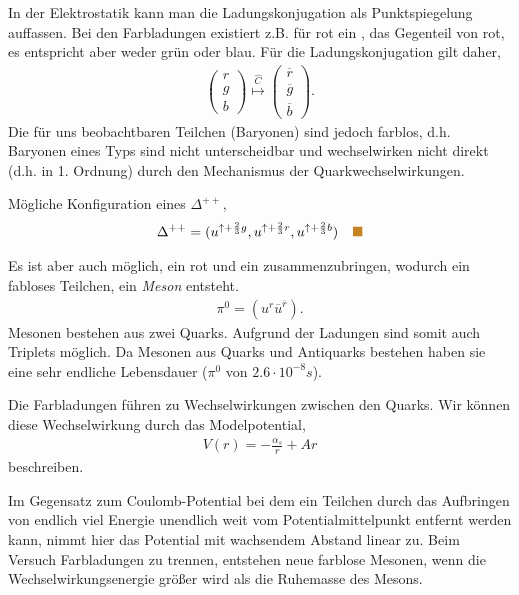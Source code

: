 In der Elektrostatik kann man die Ladungskonjugation als Punktspiegelung
auffassen. Bei den Farbladungen existiert z.B. für rot ein
, das Gegenteil von rot, es entspricht aber weder grün
oder blau. Für die Ladungskonjugation gilt daher,
\begin{align*}
\begin{pmatrix}
r \\ g \\ b
\end{pmatrix}
\overset{\hat{C}}{\mapsto}
\begin{pmatrix}
\overline{r} \\ \overline{g} \\ \overline{b}
\end{pmatrix}.
\end{align*}
Die für uns beobachtbaren Teilchen (Baryonen) sind jedoch farblos, d.h.
Baryonen eines Typs sind nicht unterscheidbar und wechselwirken nicht direkt
(d.h. in 1. Ordnung) durch den Mechanismus der Quarkwechselwirkungen.
\begin{bspn} Mögliche Konfiguration eines $\Delta^{++}$,
\begin{align*}
\Delta^{++} = (u^{\uparrow+\frac{2}{3}g},
 	  u^{\uparrow+\frac{2}{3}r},
 	  u^{\uparrow+\frac{2}{3}b})\bsphere
\end{align*}
\end{bspn}
\begin{bspn}
Es ist aber auch möglich, ein rot und ein  zusammenzubringen,
wodurch ein fabloses Teilchen, ein \emph{Meson} entsteht.
\begin{align*}
\pi^0 = (u^{r}\overline{u}^{\overline{r}}).
\end{align*}
Mesonen bestehen aus zwei Quarks. Aufgrund der Ladungen sind somit auch
Triplets möglich. Da Mesonen aus Quarks und Antiquarks bestehen haben sie eine
sehr endliche Lebensdauer ($\pi^0$ von $2.6\cdot 10^{-8}s$).\bsphere
\end{bspn}

Die Farbladungen führen zu Wechselwirkungen zwischen den Quarks. Wir können
diese Wechselwirkung durch das Modelpotential,
\begin{align*}
V(r) = -\frac{\alpha_s}{r} + Ar
\end{align*}
beschreiben.

Im Gegensatz zum Coulomb-Potential bei dem ein Teilchen durch das Aufbringen
von endlich viel Energie unendlich weit vom Potentialmittelpunkt entfernt
werden kann, nimmt hier das Potential mit wachsendem Abstand linear zu.
Beim Versuch Farbladungen zu trennen, entstehen neue farblose Mesonen, wenn die
Wechselwirkungsenergie größer wird als die Ruhemasse des Mesons.


